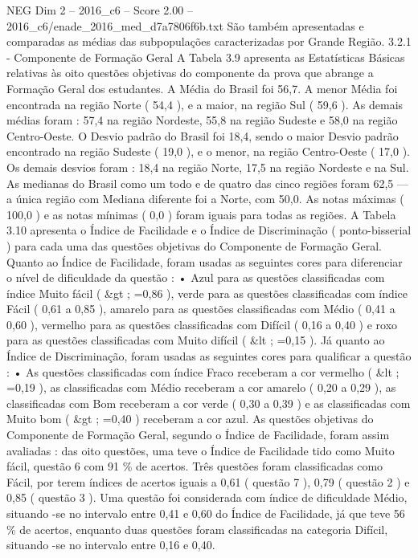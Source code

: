 \begin{textsample}{NEG Dim 2 – 2016\_c6 – Score 2.00 – 2016\_c6/enade\_2016\_med\_d7a7806f6b.txt}
São também apresentadas e comparadas as médias das subpopulações caracterizadas por Grande Região. 3.2.1 - Componente de Formação Geral A Tabela 3.9 apresenta as Estatísticas Básicas relativas às oito questões objetivas do componente da prova que abrange a Formação Geral dos estudantes.
A Média do Brasil foi 56,7.
A menor Média foi encontrada na região Norte ( 54,4 ), e a maior, na região Sul ( 59,6 ).
As demais médias foram : 57,4 na região Nordeste, 55,8 na região Sudeste e 58,0 na região Centro-Oeste.
O Desvio padrão do Brasil foi 18,4, sendo o maior Desvio padrão encontrado na região Sudeste ( 19,0 ), e o menor, na região Centro-Oeste ( 17,0 ).
Os demais desvios foram : 18,4 na região Norte, 17,5 na região Nordeste e na Sul.
As medianas do Brasil como um todo e de quatro das cinco regiões foram 62,5 — a única região com Mediana diferente foi a Norte, com 50,0.
As notas máximas ( 100,0 ) e as notas mínimas ( 0,0 ) foram iguais para todas as regiões.
A Tabela 3.10 apresenta o Índice de Facilidade e o Índice de Discriminação ( ponto-bisserial ) para cada uma das questões objetivas do Componente de Formação Geral.
Quanto ao Índice de Facilidade, foram usadas as seguintes cores para diferenciar o nível de dificuldade da questão : • Azul para as questões classificadas com índice Muito fácil ( \&gt ; =0,86 ), verde para as questões classificadas com índice Fácil ( 0,61 a 0,85 ), amarelo para as questões classificadas com Médio ( 0,41 a 0,60 ), vermelho para as questões classificadas com Difícil ( 0,16 a 0,40 ) e roxo para as questões classificadas com Muito difícil ( \&lt ; =0,15 ).
Já quanto ao Índice de Discriminação, foram usadas as seguintes cores para qualificar a questão : • As questões classificadas com índice Fraco receberam a cor vermelho ( \&lt ; =0,19 ), as classificadas com Médio receberam a cor amarelo ( 0,20 a 0,29 ), as classificadas com Bom receberam a cor verde ( 0,30 a 0,39 ) e as classificadas com Muito bom ( \&gt ; =0,40 ) receberam a cor azul.
As questões objetivas do Componente de Formação Geral, segundo o Índice de Facilidade, foram assim avaliadas : das oito questões, uma teve o Índice de Facilidade tido como Muito fácil, questão 6 com 91 \% de acertos.
Três questões foram classificadas como Fácil, por terem índices de acertos iguais a 0,61 ( questão 7 ), 0,79 ( questão 2 ) e 0,85 ( questão 3 ).
Uma questão foi considerada com índice de dificuldade Médio, situando -se no intervalo entre 0,41 e 0,60 do Índice de Facilidade, já que teve 56 \% de acertos, enquanto duas questões foram classificadas na categoria Difícil, situando -se no intervalo entre 0,16 e 0,40.

\end{textsample}
